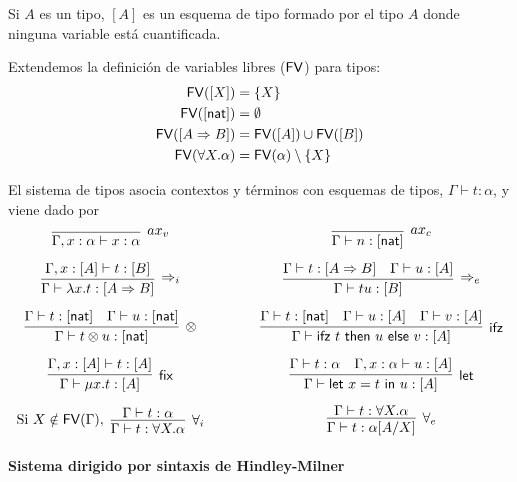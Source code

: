 \documentclass[twoside,a4paper,12pt]{article}
\theoremstyle{definition}
\theoremstyle{remark}
\begin{document}
Si $A$ es un tipo, $[A]$ es un esquema de tipo formado por el tipo $A$ donde
ninguna variable está cuantificada.

\begin{definicion}{6.3}
  Extendemos la definición de variables libres ($\mathsf{FV}$) para tipos:
  \begin{align*}
    \mathsf{FV}([X]) & = \{X\}\\
    \mathsf{FV}([\mathsf{nat}]) & = \emptyset\\
    \mathsf{FV}([A\Rightarrow B]) & = \mathsf{FV}([A])\cup\mathsf{FV}([B])\\
    \mathsf{FV}(\forall X.\alpha) & = \mathsf{FV}(\alpha)\setminus\{X\}
  \end{align*}
\end{definicion}

\begin{definicion}{6.4}
  El sistema de tipos asocia contextos y términos con esquemas de tipos,
  $\Gamma\vdash t:\alpha$, y viene dado por
  \[
    \begin{array}{c@{\qquad\qquad}c}
      \infer[ax_v]{\Gamma,x:\alpha\vdash x:\alpha}{}
      &
        \infer[ax_c]{\Gamma\vdash n:[\nat]}{}
      \\[2ex]
      \infer[\Rightarrow_i]{\Gamma\vdash\fun xt:[A\Rightarrow B]}
      {\Gamma,x:[A]\vdash t:[B]}
      &
        \infer[\Rightarrow_e]{\Gamma\vdash tu:[B]}
        {
        \Gamma\vdash t:[A\Rightarrow B]
      &
        \Gamma\vdash u:[A]
        }
      \\[2ex]
      \infer[\otimes]{\Gamma\vdash t\otimes u:[\nat]}
      {\Gamma\vdash t:[\nat] & \Gamma\vdash u:[\nat]}
      &
        \infer[\mathsf{ifz}]{\Gamma\vdash\ifz tuv:[A]}
        {\Gamma\vdash t:[\nat] & \Gamma\vdash u:[A] & \Gamma\vdash v:[A]}
      \\[2ex]
      \infer[\mathsf{fix}]{\Gamma\vdash\fix xt:[A]}{\Gamma,x:[A]\vdash t:[A]}
      &
        \infer[\mathsf{let}]{\Gamma\vdash\letl xtu:[A]}
        {\Gamma\vdash t:\alpha & \Gamma,x:\alpha\vdash u:[A]}
      \\[2ex]
      \textrm{Si }X\notin\FV(\Gamma),\ \vcenter{\infer[\forall_i]{\Gamma\vdash t:\forall X.\alpha}{\Gamma\vdash t:\alpha}}
      &
        \vcenter{\infer[\forall_e]{\Gamma\vdash t:\alpha[A/X]}{\Gamma\vdash t:\forall X.\alpha}}
    \end{array}
  \]
\end{definicion}

\paragraph*{Sistema dirigido por sintaxis de Hindley-Milner}
\end{document}
